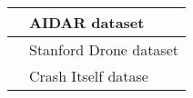 \begin{table}[h]
\begin{tabular}{|c|l|}
\cite{kyrkou2020emergencynet}                                                                                                                                                                                            & AIDAR dataset                                                                                     \\ \hline
\cite{jung2018perception}                                                                                                                                                                                                & Stanford Drone dataset                                                                            \\ \hline
\cite{gandhi2017learning}                                                                                                                                                                                                & Crash Itself datase                                                                               \\ \hline
\end{tabular}
\label{literature}
\end{table}